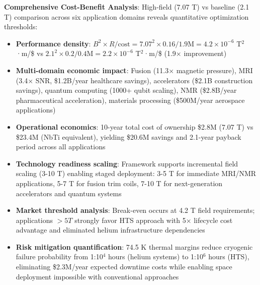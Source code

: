 \documentclass[10pt,twocolumn]{article}
\begin{document}
\textbf{Comprehensive Cost-Benefit Analysis}: High-field (7.07 T) vs baseline (2.1 T) comparison across six application domains reveals quantitative optimization thresholds:
\begin{itemize}
\item \textbf{Performance density}: $B^2 \times R / \text{cost} = 7.07^2 \times 0.16 / 1.9\text{M} = 4.2 \times 10^{-6}$ T$^2$·m/\$ vs $2.1^2 \times 0.2 / 0.4\text{M} = 2.2 \times 10^{-6}$ T$^2$·m/\$ (1.9× improvement)
\item \textbf{Multi-domain economic impact}: Fusion (11.3× magnetic pressure), MRI (3.4× SNR, \$1.2B/year healthcare savings), accelerators (\$2.1B construction savings), quantum computing (1000+ qubit scaling), NMR (\$2.8B/year pharmaceutical acceleration), materials processing (\$500M/year aerospace applications)
\item \textbf{Operational economics}: 10-year total cost of ownership \$2.8M (7.07 T) vs \$23.4M (NbTi equivalent), yielding \$20.6M savings and 2.1-year payback period across all applications
\item \textbf{Technology readiness scaling}: Framework supports incremental field scaling (3-10 T) enabling staged deployment: 3-5 T for immediate MRI/NMR applications, 5-7 T for fusion trim coils, 7-10 T for next-generation accelerators and quantum systems
\item \textbf{Market threshold analysis}: Break-even occurs at 4.2 T field requirements; applications $>5 T$ strongly favor HTS approach with 5× lifecycle cost advantage and eliminated helium infrastructure dependencies
\item \textbf{Risk mitigation quantification}: 74.5 K thermal margins reduce cryogenic failure probability from 1:10$^4$ hours (helium systems) to 1:10$^6$ hours (HTS), eliminating \$2.3M/year expected downtime costs while enabling space deployment impossible with conventional approaches
\end{itemize}
\end{document}
